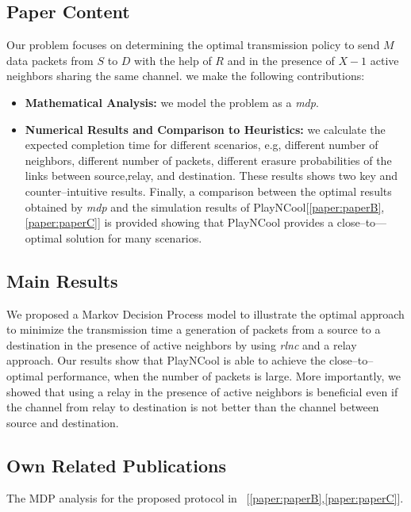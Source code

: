  \subsection*{Paper Content}
Our problem focuses on determining the optimal transmission policy to send $M$ data packets from $S$ to $D$ with the help of $R$ and in the presence of $X-1$ active neighbors sharing the same channel. we make the following contributions:
\begin{itemize}
\item \textbf{Mathematical Analysis:} we model the problem as a \textit{mdp}.
\item\textbf{Numerical Results and Comparison to Heuristics:}
we calculate the expected completion time for different scenarios, e.g,
different number of neighbors, different number of packets,
different erasure probabilities of the links between source,relay, and destination. These results shows two key and counter--intuitive results.
Finally, a comparison between the optimal results obtained by \textit{mdp} and the simulation results of PlayNCool[\ref{paper:paperB},\ref{paper:paperC}] is provided showing that PlayNCool provides a close--to—optimal solution for many scenarios.
\end{itemize}\subsection*{Main Results}
We proposed a Markov Decision Process model to illustrate the optimal approach to minimize the transmission time a generation of packets from a source to a destination in the presence of active neighbors by using \textit{rlnc} and a relay approach. Our results show that PlayNCool is able to achieve the close--to--optimal performance, when the number of packets is large. More importantly, we showed that using a relay in the presence of active neighbors is beneficial even if the channel from relay to destination is not better than the channel between source and destination.
\subsection*{Own Related Publications}
The MDP analysis for the proposed protocol in ~[\ref{paper:paperB},\ref{paper:paperC}].
\clearpage
